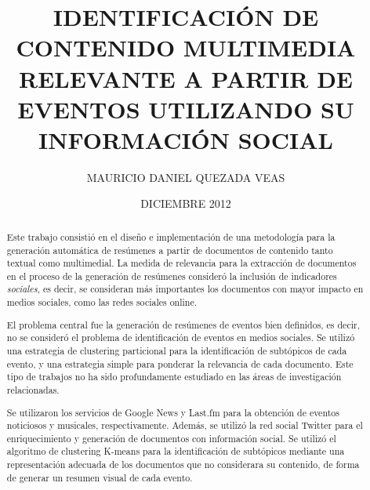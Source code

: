\documentclass[upright, contnum]{umemoria}
\author{MAURICIO DANIEL QUEZADA VEAS}
\title{IDENTIFICACI\'ON DE CONTENIDO MULTIMEDIA RELEVANTE A PARTIR DE EVENTOS UTILIZANDO SU INFORMACI\'ON SOCIAL}
\date{DICIEMBRE 2012}
\begin{document}
\frontmatter
\maketitle

\begin{abstract}

Este trabajo consistió en el diseño e implementación de una metodología para la generación automática
de resúmenes a partir de documentos de contenido tanto textual como multimedial. La medida de relevancia para
la extracción de documentos en el proceso de la generación de resúmenes consideró la inclusión de indicadores
\textit{sociales}, es decir, se consideran más importantes los documentos con mayor impacto en medios sociales, como
las redes sociales online.

El problema central fue la generación de resúmenes de eventos bien definidos, es decir, no se consideró el problema
de identificación de eventos en medios sociales. Se utilizó una estrategia de clustering particional para la identificación
de subtópicos de cada evento, y una estrategia simple para ponderar la relevancia de cada documento. Este tipo de trabajos
no ha sido profundamente estudiado en las áreas de investigación relacionadas.

Se utilizaron los servicios de Google News y Last.fm para la obtención de eventos noticiosos y musicales, respectivamente.
Además, se utilizó la red social Twitter para el enriquecimiento y generación de documentos con información social. Se utilizó el
algoritmo de clustering K-means para la identificación de subtópicos mediante una representación adecuada de los documentos que
no considerara su contenido, de forma de generar un resumen visual de cada evento.

\end{abstract}



\cleardoublepage
\begin{spacing}{1.5}
\tableofcontents
\end{spacing}
\listoffigures

\mainmatter







\nocite{*}




\end{document}
